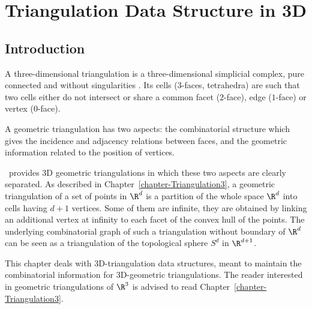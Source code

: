 \chapter{Triangulation Data Structure in 3D}
\label{chapter-TDS3}

\section{Introduction}
\label{TDS3-sec-intro}

A three-dimensional triangulation is a three-dimensional simplicial
complex, pure connected and without singularities \cite{by-ag-98}. Its
cells ($3$-faces, tetrahedra) are such that two cells either do not
intersect or share a common facet ($2$-face), edge ($1$-face) or
vertex ($0$-face).

A geometric triangulation has two aspects: the combinatorial structure which
gives the incidence and adjacency relations between faces, and the
geometric information related to the position of vertices.

\cgal\ provides 3D geometric triangulations in which these
two aspects are clearly separated.
As described in Chapter~\ref{chapter-Triangulation3}, a geometric
triangulation of a set of points in $\R^d$ is a partition of the
whole space $\R^d$ into cells having $d+1$ vertices. Some of them
are infinite, they are obtained by linking an additional vertex at
infinity to each facet of the convex hull of the points.
The underlying combinatorial graph of such a triangulation
without boundary of $\R^d$ can be seen as a triangulation of the
topological sphere $S^d$ in $\R^{d+1}$. 

This chapter deals with 3D-triangulation data structures, meant to
maintain the combinatorial information for 3D-geometric
triangulations. The reader interested in geometric triangulations of
$\R^3$ is advised to read Chapter~\ref{chapter-Triangulation3}.

